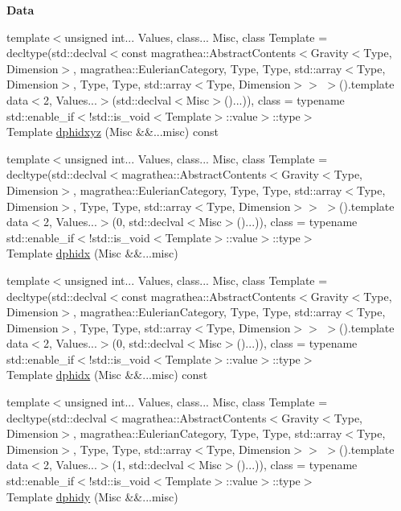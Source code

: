 \begin{Indent}{\bf Data}
\begin{DoxyCompactItemize}
\item 
{\footnotesize template$<$unsigned int... Values, class... Misc, class Template  = decltype(std\-::declval$<$const magrathea\-::\-Abstract\-Contents$<$\-Gravity$<$\-Type, Dimension$>$, magrathea\-::\-Eulerian\-Category, Type, Type, std\-::array$<$\-Type, Dimension$>$, Type, Type, std\-::array$<$\-Type, Dimension$>$$>$ $>$().\-template data$<$2, Values...$>$(std\-::declval$<$\-Misc$>$()...)), class  = typename std\-::enable\-\_\-if$<$!std\-::is\-\_\-void$<$\-Template$>$\-::value$>$\-::type$>$ }\\Template \hyperlink{exceptionGravity_a4f11fec6ecaff1b01821890457e66bd9}{dphidxyz} (Misc \&\&...misc) const 
\item 
{\footnotesize template$<$unsigned int... Values, class... Misc, class Template  = decltype(std\-::declval$<$magrathea\-::\-Abstract\-Contents$<$\-Gravity$<$\-Type, Dimension$>$, magrathea\-::\-Eulerian\-Category, Type, Type, std\-::array$<$\-Type, Dimension$>$, Type, Type, std\-::array$<$\-Type, Dimension$>$$>$ $>$().\-template data$<$2, Values...$>$(0, std\-::declval$<$\-Misc$>$()...)), class  = typename std\-::enable\-\_\-if$<$!std\-::is\-\_\-void$<$\-Template$>$\-::value$>$\-::type$>$ }\\Template \hyperlink{exceptionGravity_a6c79d0fee6ef4d993d4a15eab5c04fd8}{dphidx} (Misc \&\&...misc)
\item 
{\footnotesize template$<$unsigned int... Values, class... Misc, class Template  = decltype(std\-::declval$<$const magrathea\-::\-Abstract\-Contents$<$\-Gravity$<$\-Type, Dimension$>$, magrathea\-::\-Eulerian\-Category, Type, Type, std\-::array$<$\-Type, Dimension$>$, Type, Type, std\-::array$<$\-Type, Dimension$>$$>$ $>$().\-template data$<$2, Values...$>$(0, std\-::declval$<$\-Misc$>$()...)), class  = typename std\-::enable\-\_\-if$<$!std\-::is\-\_\-void$<$\-Template$>$\-::value$>$\-::type$>$ }\\Template \hyperlink{exceptionGravity_aa2beccc3bed46958484f285af231d463}{dphidx} (Misc \&\&...misc) const 
\item 
{\footnotesize template$<$unsigned int... Values, class... Misc, class Template  = decltype(std\-::declval$<$magrathea\-::\-Abstract\-Contents$<$\-Gravity$<$\-Type, Dimension$>$, magrathea\-::\-Eulerian\-Category, Type, Type, std\-::array$<$\-Type, Dimension$>$, Type, Type, std\-::array$<$\-Type, Dimension$>$$>$ $>$().\-template data$<$2, Values...$>$(1, std\-::declval$<$\-Misc$>$()...)), class  = typename std\-::enable\-\_\-if$<$!std\-::is\-\_\-void$<$\-Template$>$\-::value$>$\-::type$>$ }\\Template \hyperlink{exceptionGravity_a8cf27f2813e85ea1eebe12bcd6ad7195}{dphidy} (Misc \&\&...misc)

\end{DoxyCompactItemize}
\end{Indent}
